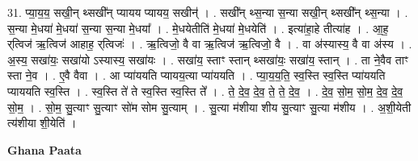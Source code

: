 \documentclass[17pt]{extarticle}
\begin{document}
31. प्या॒य॒य॒ सखी॒न् थ्सखी᳚न् प्यायय प्यायय॒ सखीन्॑ । . सखी᳚न् थ्स॒न्या स॒न्या सखी॒न् थ्सखी᳚न् थ्स॒न्या । . स॒न्या मे॒धया॑ मे॒धया॑ स॒न्या स॒न्या मे॒धया᳚ । . मे॒धयेतीति॑ मे॒धया॑ मे॒धयेति॑ । . इत्या॑हा॒हे तीत्या॑ह । . आ॒ह॒ र्‌त्विज॑ ऋ॒त्विज॑ आहाह॒ र्‌त्विजः॑ । . ऋ॒त्विजो॒ वै वा ऋ॒त्विज॑ ऋ॒त्विजो॒ वै । . वा अ॑स्यास्य॒ वै वा अ॑स्य । . अ॒स्य॒ सखा॑यः॒ सखा॑यो ऽस्यास्य॒ सखा॑यः । . सखा॑य॒ स्ताꣳ स्तान् थ्सखा॑यः॒ सखा॑य॒ स्तान् । . ता ने॒वैव ताꣳ स्ता ने॒व । . ए॒वै वैवा । . आ प्या॑ययति प्यायय॒त्या प्या॑ययति । . प्या॒य॒य॒ति॒ स्व॒स्ति स्व॒स्ति प्या॑ययति प्याययति स्व॒स्ति । . स्व॒स्ति ते॑ ते स्व॒स्ति स्व॒स्ति ते᳚ । . ते॒ दे॒व॒ दे॒व॒ ते॒ ते॒ दे॒व॒ । . दे॒व॒ सो॒म॒ सो॒म॒ दे॒व॒ दे॒व॒ सो॒म॒ । . सो॒म॒ सु॒त्याꣳ सु॒त्याꣳ सो॑म सोम सु॒त्याम् । . सु॒त्या म॑शीया शीय सु॒त्याꣳ सु॒त्या म॑शीय । . अ॒शी॒येती त्य॑शीया शी॒येति॑ । \newline

\textbf{Ghana Paata } \newline
\end{document}
